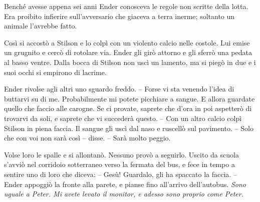 {Benché avesse appena sei anni Ender conosceva le regole non scritte
	della lotta. Era proibito infierire sull'avversario che giaceva a terra
	inerme; soltanto un animale l'avrebbe fatto.}

{Così si accostò a Stilson e lo colpì con un violento calcio nelle
	costole. Lui emise un grugnito e cercò di rotolare via. Ender gli girò
	attorno e gli sferrò una pedata al basso ventre. Dalla bocca di Stilson
	non uscì un lamento, ma si piegò in due e i suoi occhi si empirono di
	lacrime.}

{Ender rivolse agli altri uno sguardo freddo. -- Forse vi sta venendo
	l'idea di buttarvi su di me. Probabilmente mi potete picchiare a sangue.
	E allora guardate quello che faccio alle carogne. Se ci provate, saprete
	che d'ora in poi aspetterò di trovarvi da soli, e saprete che vi
	succederà questo. -- Con un altro calcio colpì Stilson in piena faccia.
	Il sangue gli uscì dal naso e ruscellò sul pavimento. -- Solo che con
	voi non sarà così -- disse. -- Sarà molto peggio.}

{Volse loro le spalle e si allontanò. Nessuno provò a seguirlo. Uscito
	da scuola s'avviò nel corridoio sotterraneo verso la fermata del bus, e
	fece in tempo a sentire uno di loro che diceva: -- Gesù! Guardalo, gli
	ha spaccato la faccia. -- Ender appoggiò la fronte alla parete, e pianse
	fino all'arrivo dell'autobus. \emph{Sono uguale a Peter. Mi avete levato
		il monitor, e adesso sono proprio come Peter.}}